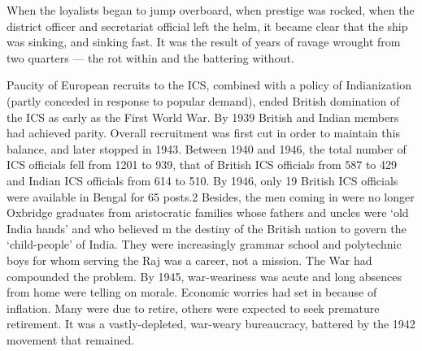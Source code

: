 \begin{multicols}{2}
When the loyalists began to jump overboard, when prestige was rocked, when the district officer and secretariat official left the helm, it became clear that the ship was sinking, and sinking fast. It was the result of years of ravage wrought from two quarters --- the rot within and the battering without. 

Paucity of European recruits to the ICS, combined with a policy of Indianization (partly conceded in response to popular demand), ended British domination of the ICS as early as the First World War. By 1939 British and Indian members had achieved parity. Overall recruitment was first cut in order to maintain this balance, and later stopped in 1943. Between 1940 and 1946, the total number of ICS officials fell from 1201 to 939, that of British ICS officials from 587 to 429 and Indian ICS officials from 614 to 510. By 1946, only 19 British ICS officials were available in Bengal for 65 posts.2 Besides, the men coming in were no longer Oxbridge graduates from aristocratic families whose fathers and uncles were `old India hands' and who believed m the destiny of the British nation to govern the `child-people' of India. They were increasingly grammar school and polytechnic boys for whom serving the Raj was a career, not a mission. The War had compounded the problem. By 1945, war-weariness was acute and long absences from home were telling on morale. Economic worries had set in because of inflation. Many were due to retire, others were expected to seek premature retirement. It was a vastly-depleted, war-weary bureaucracy, battered by the 1942 movement that remained. 


\end{multicols}

